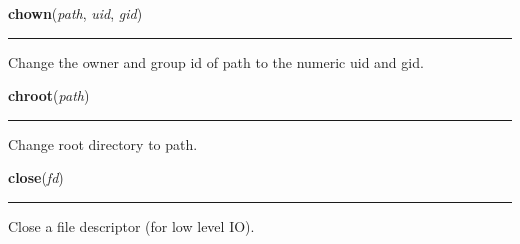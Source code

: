     \vspace{0.5ex}

\hspace{.8\funcindent}\begin{boxedminipage}{\funcwidth}

    \raggedright \textbf{chown}(\textit{path}, \textit{uid}, \textit{gid})

    \vspace{-1.5ex}

    \rule{\textwidth}{0.5\fboxrule}
\setlength{\parskip}{2ex}
    Change the owner and group id of path to the numeric uid and gid.

\setlength{\parskip}{1ex}
    \end{boxedminipage}

    \label{os:chroot}

    \vspace{0.5ex}

\hspace{.8\funcindent}\begin{boxedminipage}{\funcwidth}

    \raggedright \textbf{chroot}(\textit{path})

    \vspace{-1.5ex}

    \rule{\textwidth}{0.5\fboxrule}
\setlength{\parskip}{2ex}
    Change root directory to path.

\setlength{\parskip}{1ex}
    \end{boxedminipage}

    \label{os:close}

    \vspace{0.5ex}

\hspace{.8\funcindent}\begin{boxedminipage}{\funcwidth}

    \raggedright \textbf{close}(\textit{fd})

    \vspace{-1.5ex}

    \rule{\textwidth}{0.5\fboxrule}
\setlength{\parskip}{2ex}
    Close a file descriptor (for low level IO).

\setlength{\parskip}{1ex}
    \end{boxedminipage}

    \label{os:closerange}

